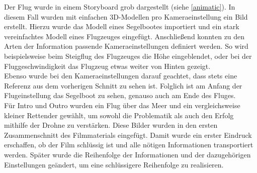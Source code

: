 Der Flug wurde in einem Storyboard grob dargestellt (siehe \autoref{animatic}). In diesem Fall wurden mit einfachen 3D-Modellen pro Kameraeinstellung ein Bild erstellt. Hierzu wurde das Modell eines Segelbootes importiert und ein stark vereinfachtes Modell eines Flugzeuges eingefügt. Anschließend konnten zu den Arten der Information passende Kameraeinstellungen definiert werden. So wird beispielsweise beim Steigflug des Flugzeuges die Höhe eingeblendet, oder bei der Fluggeschwindigkeit das Flugzeug etwas weiter von Hinten gezeigt. \\
Ebenso wurde bei den Kameraeinstellungen darauf geachtet, dass stets eine Referenz aus dem vorherigen Schnitt zu sehen ist. Folglich ist am Anfang der Flugeinstellung das Segelboot zu sehen, genauso auch am Ende des Fluges.\\
Für Intro und Outro wurden ein Flug über das Meer und ein vergleichsweise kleiner Rettender gewählt, um sowohl die Problematik als auch den Erfolg mithilfe der Drohne zu verstärken.
Diese Bilder wurden in den ersten Zusammenschnitt des Filmmaterials eingefügt. Damit wurde ein erster Eindruck erschaffen, ob der Film schlüssig ist und alle nötigen Informationen transportiert werden. Später wurde die Reihenfolge der Informationen und der dazugehörigen Einstellungen geändert, um eine schlüssigere Reihenfolge zu realisieren.

